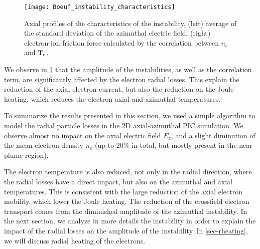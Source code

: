     \begin{figure}[!hbt]
      \centering
      \texttt{[image: Boeuf\_instability\_characteristics]}
      \caption{Axial profiles of the characteristics of the instability, (left) average of the standard deviation of the azimuthal electric field, (right) electron-ion friction force calculated by the correlation between $n_e$ and $\mathrm{T_e}$.    }
      \label{fig-boeuf-instability}
    \end{figure}

    
    We observe in \cref{fig-boeuf-instability} that the amplitude of the instabilities, as well as the correlation term, are significantly affected by the electron radial losses.
    This explain the reduction of the axial electron current, but also the reduction on the Joule heating, which reduces the electron axial and azimuthal temperatures.

    \vspace{1em}
    To summarize the results presented in this section, we used a simple algorithm to model the radial particle losses in the \ac{2D} axial-azimuthal \ac{PIC} simulation.
    We observe almost no impact on the axial electric field $E_z$, and a slight diminution of the mean electron density $n_e$ (up to 20\% in total, but mostly present in the near-plume region).
    
    The electron temperature is also reduced, not only in the radial direction, where the radial losses have a direct impact, but also on the azimuthal and axial temperatures.
    This is consistent with the large reduction of the axial electron mobility, which lower the Joule heating.
    The reduction of the crossfield electron transport comes from the diminished amplitude of the azimuthal instability.
    In the next section, we analyze in more details the instability in order to explain the impact of the radial losses on the amplitude of the instability.
    In \cref{sec-rheating}, we will discuss radial heating of the electrons.


\afterpage{\clearpage}
